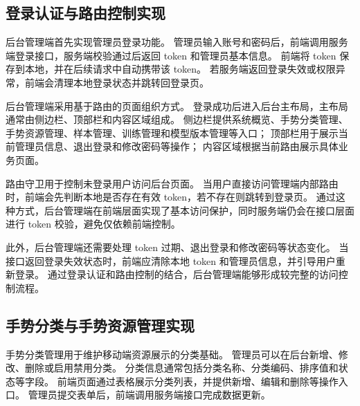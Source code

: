 
\subsection{登录认证与路由控制实现}

后台管理端首先实现管理员登录功能。
管理员输入账号和密码后，前端调用服务端登录接口，服务端校验通过后返回 token 和管理员基本信息。
前端将 token 保存到本地，并在后续请求中自动携带该 token。
若服务端返回登录失效或权限异常，前端会清理本地登录状态并跳转回登录页。

后台管理端采用基于路由的页面组织方式。
登录成功后进入后台主布局，主布局通常由侧边栏、顶部栏和内容区域组成。
侧边栏提供系统概览、手势分类管理、手势资源管理、样本管理、训练管理和模型版本管理等入口；
顶部栏用于展示当前管理员信息、退出登录和修改密码等操作；
内容区域根据当前路由展示具体业务页面。

路由守卫用于控制未登录用户访问后台页面。
当用户直接访问管理端内部路由时，前端会先判断本地是否存在有效 token，若不存在则跳转到登录页。
通过这种方式，后台管理端在前端层面实现了基本访问保护，同时服务端仍会在接口层面进行 token 校验，避免仅依赖前端控制。

此外，后台管理端还需要处理 token 过期、退出登录和修改密码等状态变化。
当接口返回登录失效状态时，前端应清除本地 token 和管理员信息，并引导用户重新登录。
通过登录认证和路由控制的结合，后台管理端能够形成较完整的访问控制流程。

\subsection{手势分类与手势资源管理实现}

手势分类管理用于维护移动端资源展示的分类基础。
管理员可以在后台新增、修改、删除或启用禁用分类。
分类信息通常包括分类名称、分类编码、排序值和状态等字段。
前端页面通过表格展示分类列表，并提供新增、编辑和删除等操作入口。
管理员提交表单后，前端调用服务端接口完成数据更新。

